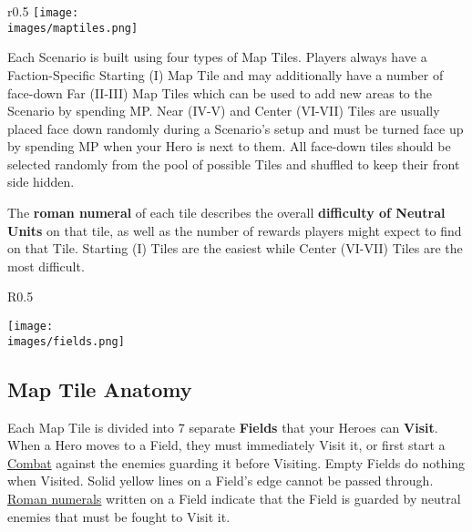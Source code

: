 
\bigskip

\begin{wrapfigure}{r}{0.5\textwidth}
  \texttt{[image: \\images/maptiles.png]}
\end{wrapfigure}
Each Scenario is built using four types of Map Tiles.
Players always have a Faction-Specific Starting (I) Map Tile and may additionally have a number of face-down Far (II-III) Map Tiles which can be used to add new areas to the Scenario by spending MP.
Near (IV-V) and Center (VI-VII) Tiles are usually placed face down randomly during a Scenario’s setup and must be turned face up by spending MP when your Hero is next to them.
All face-down tiles should be selected randomly from the pool of possible Tiles and shuffled to keep their front side hidden.\par
The \textbf{roman numeral} of each tile describes the overall \textbf{difficulty of Neutral Units} on that tile, as well as the number of rewards players might expect to find on that Tile.
Starting (I) Tiles are the easiest while Center (VI-VII) Tiles are the most difficult.\par
\par

\begin{wrapfigure}{R}{0.5\textwidth}
  \begin{center}
  \texttt{[image: \\images/fields.png]}
  \end{center}
\end{wrapfigure}
\subsection*{Map Tile Anatomy}
Each Map Tile is divided into 7 separate \textbf{Fields} that your Heroes can \textbf{Visit}.
When a Hero moves to a Field, they must immediately Visit it, or
first start a \hyperlink{Combat}{Combat} against the enemies guarding it before Visiting.
Empty Fields do nothing when Visited.
Solid yellow lines on a Field's edge cannot be passed through.
\hyperlink{Difficulty}{Roman numerals} written on a Field indicate that the Field is guarded by neutral enemies that must be fought to Visit it.\par

\clearpage

